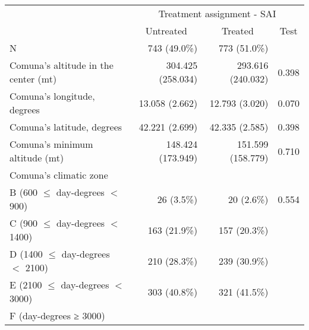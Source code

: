 
\begin{table}[!h]
\centering
\begin{tabular}{llll}
\cline{1-4}
\multicolumn{1}{r}{} &
  \multicolumn{3}{c}{Treatment assignment - SAI} \\
\multicolumn{1}{r}{} &
  \multicolumn{1}{c}{Untreated} &
  \multicolumn{1}{c}{Treated} &
  \multicolumn{1}{c}{Test} \\
\cline{1-4}
\multicolumn{1}{l}{N} &
  \multicolumn{1}{r}{743 (49.0\%)} &
  \multicolumn{1}{r}{773 (51.0\%)} &
  \multicolumn{1}{r}{} \\
\multicolumn{1}{l}{Comuna's altitude in the center (mt)} &
  \multicolumn{1}{r}{304.425 (258.034)} &
  \multicolumn{1}{r}{293.616 (240.032)} &
  \multicolumn{1}{r}{0.398} \\
\multicolumn{1}{l}{Comuna's longitude, degrees} &
  \multicolumn{1}{r}{13.058 (2.662)} &
  \multicolumn{1}{r}{12.793 (3.020)} &
  \multicolumn{1}{r}{0.070} \\
\multicolumn{1}{l}{Comuna's latitude, degrees} &
  \multicolumn{1}{r}{42.221 (2.699)} &
  \multicolumn{1}{r}{42.335 (2.585)} &
  \multicolumn{1}{r}{0.398} \\
\multicolumn{1}{l}{Comuna's minimum altitude (mt)} &
  \multicolumn{1}{r}{148.424 (173.949)} &
  \multicolumn{1}{r}{151.599 (158.779)} &
  \multicolumn{1}{r}{0.710} \\
\multicolumn{1}{l}{Comuna's climatic zone} &
  \multicolumn{1}{r}{} &
  \multicolumn{1}{r}{} &
  \multicolumn{1}{r}{} \\
\multicolumn{1}{l}{\hspace{1em}B (600 $\le$ day-degrees $<$ 900)} &
  \multicolumn{1}{r}{26 (3.5\%)} &
  \multicolumn{1}{r}{20 (2.6\%)} &
  \multicolumn{1}{r}{0.554} \\
\multicolumn{1}{l}{\hspace{1em}C (900 $\le$ day-degrees $<$ 1400)} &
  \multicolumn{1}{r}{163 (21.9\%)} &
  \multicolumn{1}{r}{157 (20.3\%)} &
  \multicolumn{1}{r}{} \\
\multicolumn{1}{l}{\hspace{1em}D (1400 $\le$ day-degrees $<$ 2100)} &
  \multicolumn{1}{r}{210 (28.3\%)} &
  \multicolumn{1}{r}{239 (30.9\%)} &
  \multicolumn{1}{r}{} \\
\multicolumn{1}{l}{\hspace{1em}E (2100 $\le$ day-degrees $<$ 3000)} &
  \multicolumn{1}{r}{303 (40.8\%)} &
  \multicolumn{1}{r}{321 (41.5\%)} &
  \multicolumn{1}{r}{} \\
\multicolumn{1}{l}{\hspace{1em}F (day-degrees ≥ 3000)} &

\end{tabular}
\end{table}

